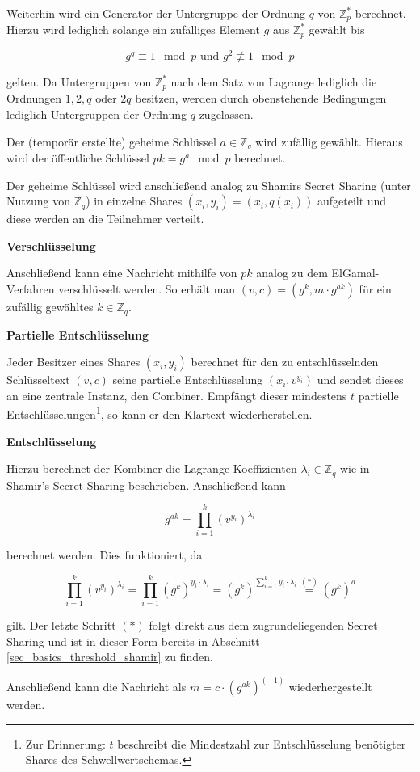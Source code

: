 Weiterhin wird ein Generator der Untergruppe der Ordnung \(q\) von \(\mathbb{Z}_p^*\) berechnet. Hierzu wird lediglich solange ein zufälliges Element \(g\) aus \(\mathbb{Z}_p^*\) gewählt bis 

\[g^q \equiv 1 \mod p \text{ und } g^2 \not\equiv 1 \mod p\] 

gelten. Da Untergruppen von \(\mathbb{Z}_p^*\) nach dem Satz von Lagrange lediglich die Ordnungen \(1,2,q \text{ oder } 2q\) besitzen, werden durch obenstehende Bedingungen lediglich Untergruppen der Ordnung \(q\) zugelassen.

Der (temporär erstellte) geheime Schlüssel \(a \in \mathbb{Z}_q\) wird zufällig gewählt. Hieraus wird der öffentliche Schlüssel \(pk = g^a \mod p\) berechnet.

Der geheime Schlüssel wird anschließend analog zu Shamirs Secret Sharing (unter Nutzung von \(\mathbb{Z}_q\)) in einzelne Shares \((x_i, y_i) = (x_i, q(x_i))\) aufgeteilt und diese werden an die Teilnehmer verteilt. 

\textbf{Verschlüsselung}

Anschließend kann eine Nachricht mithilfe von \(pk\) analog zu dem ElGamal-Verfahren verschlüsselt werden.  So erhält man \((v,c) = (g^k, m \cdot g^{ak})\) für ein zufällig gewähltes \(k \in \mathbb{Z}_q\).

\textbf{Partielle Entschlüsselung}

Jeder Besitzer eines Shares \((x_i, y_i)\) berechnet für den zu entschlüsselnden Schlüsseltext \((v,c)\) seine partielle Entschlüsselung \((x_i, v^{y_i})\) und sendet dieses an eine zentrale Instanz, den Combiner. Empfängt dieser mindestens \(t\) partielle Entschlüsselungen\footnote{
  Zur Erinnerung: \(t\) beschreibt die Mindestzahl zur Entschlüsselung benötigter Shares des Schwellwertschemas.
}, so kann er den Klartext wiederherstellen.

\textbf{Entschlüsselung}

Hierzu berechnet der Kombiner die Lagrange-Koeffizienten \(\lambda_i \in \mathbb{Z}_q\) wie in Shamir's Secret Sharing beschrieben. Anschließend kann
 
\[g^{ak} = \prod_{i=1}^k (v^{y_i})^{\lambda_i}\]

berechnet werden. Dies funktioniert, da 

\[
\prod_{i=1}^k (v^{y_i})^{\lambda_i} = 
\prod_{i=1}^k (g^k)^{y_i \cdot \lambda_i} = 
(g^k)^{\sum_{i=1}^{k} y_i \cdot \lambda_i} \overset{(*)}{=}
(g^k)^a
\]

gilt. Der letzte Schritt \((*)\) folgt direkt aus dem zugrundeliegenden Secret Sharing und ist in dieser Form bereits in Abschnitt \ref{sec_basics_threshold_shamir} zu finden.

Anschließend kann die Nachricht als \(m = c \cdot (g^{ak})^{(-1)}\) wiederhergestellt werden. 
